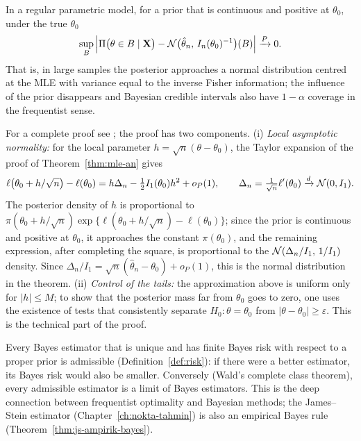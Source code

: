 \documentclass[main.tex]{subfiles}
\begin{document}
\begin{theorem}\label{thm:bvm}
In a regular parametric model, for a prior that is continuous and positive at $\theta_0$, under the true $\theta_0$
\[
\sup_B\Big|\Pi\big(\theta\in B\mid\mathbf{X}\big)-\mathcal{N}\big(\hat\theta_n,\,I_n(\theta_0)^{-1}\big)(B)\Big|\xrightarrow{P}0 .
\]
That is, in large samples the posterior approaches a normal distribution centred at the MLE with variance equal to the inverse Fisher information; the influence of the prior disappears and Bayesian credible intervals also have $1-\alpha$ coverage in the frequentist sense.
\end{theorem}
\begin{remark}
For a complete proof see \cite[Theorem~10.1 and Lemma~10.3]{vdv}; the proof has two components. (i) \emph{Local asymptotic normality:} for the local parameter $h=\sqrt n(\theta-\theta_0)$, the Taylor expansion of the proof of Theorem~\ref{thm:mle-an} gives
\[
\ell\big(\theta_0+h/\sqrt n\big)-\ell(\theta_0)=h\Delta_n-\tfrac12I_1(\theta_0)h^2+o_P(1),\qquad\Delta_n=\tfrac1{\sqrt n}\ell'(\theta_0)\xrightarrow{d}\mathcal{N}(0,I_1).
\]
The posterior density of $h$ is proportional to $\pi(\theta_0+h/\sqrt n)\exp\{\ell(\theta_0+h/\sqrt n)-\ell(\theta_0)\}$; since the prior is continuous and positive at $\theta_0$, it approaches the constant $\pi(\theta_0)$, and the remaining expression, after completing the square, is proportional to the $\mathcal{N}(\Delta_n/I_1,\,1/I_1)$ density. Since $\Delta_n/I_1=\sqrt n(\hat\theta_n-\theta_0)+o_P(1)$, this is the normal distribution in the theorem. (ii) \emph{Control of the tails:} the approximation above is uniform only for $|h|\le M$; to show that the posterior mass far from $\theta_0$ goes to zero, one uses the existence of tests that consistently separate $H_0:\theta=\theta_0$ from $|\theta-\theta_0|\ge\varepsilon$. This is the technical part of the proof.
\end{remark}

\begin{remark}[Admissibility]
Every Bayes estimator that is unique and has finite Bayes risk with respect to a proper prior is admissible (Definition~\ref{def:risk}): if there were a better estimator, its Bayes risk would also be smaller. Conversely (Wald's complete class theorem), every admissible estimator is a limit of Bayes estimators. This is the deep connection between frequentist optimality and Bayesian methods; the James--Stein estimator (Chapter~\ref{ch:nokta-tahmin}) is also an empirical Bayes rule (Theorem~\ref{thm:js-ampirik-bayes}).
\end{remark}
\end{document}
